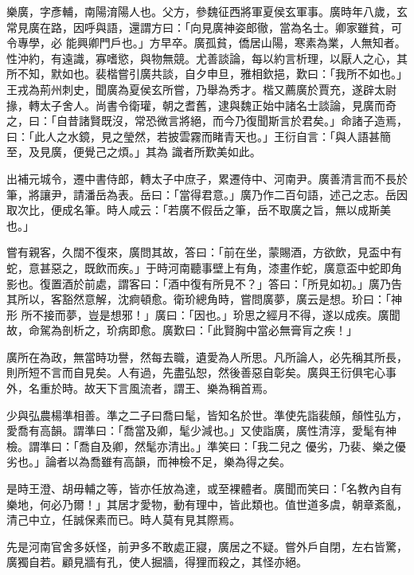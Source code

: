 \begin{pinyinscope}
 樂廣，字彥輔，南陽淯陽人也。父方，參魏征西將軍夏侯玄軍事。廣時年八歲，玄常見廣在路，因呼與語，還謂方曰：「向見廣神姿郎徹，當為名士。卿家雖貧，可令專學，必
 能興卿門戶也。」方早卒。廣孤貧，僑居山陽，寒素為業，人無知者。性沖約，有遠識，寡嗜慾，與物無競。尤善談論，每以約言析理，以厭人之心，其所不知，默如也。裴楷嘗引廣共談，自夕申旦，雅相欽挹，歎曰：「我所不如也。」王戎為荊州刺史，聞廣為夏侯玄所嘗，乃舉為秀才。楷又薦廣於賈充，遂辟太尉掾，轉太子舍人。尚書令衛瓘，朝之耆舊，逮與魏正始中諸名士談論，見廣而奇之，曰：「自昔諸賢既沒，常恐微言將絕，而今乃復聞斯言於君矣。」命諸子造焉，曰：「此人之水鏡，見之瑩然，若披雲霧而睹青天也。」王衍自言：「與人語甚簡至，及見廣，便覺己之煩。」其為
 識者所歎美如此。



 出補元城令，遷中書侍郎，轉太子中庶子，累遷侍中、河南尹。廣善清言而不長於筆，將讓尹，請潘岳為表。岳曰：「當得君意。」廣乃作二百句語，述己之志。岳因取次比，便成名筆。時人咸云：「若廣不假岳之筆，岳不取廣之旨，無以成斯美也。」



 嘗有親客，久闊不復來，廣問其故，答曰：「前在坐，蒙賜酒，方欲飲，見盃中有蛇，意甚惡之，既飲而疾。」于時河南聽事壁上有角，漆畫作蛇，廣意盃中蛇即角影也。復置酒於前處，謂客曰：「酒中復有所見不？」答曰：「所見如初。」廣乃告其所以，客豁然意解，沈痾頓愈。衛玠總角時，嘗問廣夢，廣云是想。玠曰：「神形
 所不接而夢，豈是想邪！」廣曰：「因也。」玠思之經月不得，遂以成疾。廣聞故，命駕為剖析之，玠病即愈。廣歎曰：「此賢胸中當必無膏肓之疾！」



 廣所在為政，無當時功譽，然每去職，遺愛為人所思。凡所論人，必先稱其所長，則所短不言而自見矣。人有過，先盡弘恕，然後善惡自彰矣。廣與王衍俱宅心事外，名重於時。故天下言風流者，謂王、樂為稱首焉。



 少與弘農楊準相善。準之二子曰喬曰髦，皆知名於世。準使先詣裴頠，頠性弘方，愛喬有高韻。謂準曰：「喬當及卿，髦少減也。」又使詣廣，廣性清淳，愛髦有神檢。謂準曰：「喬自及卿，然髦亦清出。」準笑曰：「我二兒之
 優劣，乃裴、樂之優劣也。」論者以為喬雖有高韻，而神檢不足，樂為得之矣。



 是時王澄、胡毋輔之等，皆亦任放為達，或至裸體者。廣聞而笑曰：「名教內自有樂地，何必乃爾！」其居才愛物，動有理中，皆此類也。值世道多虞，朝章紊亂，清己中立，任誠保素而已。時人莫有見其際焉。



 先是河南官舍多妖怪，前尹多不敢處正寢，廣居之不疑。嘗外戶自閉，左右皆驚，廣獨自若。顧見牆有孔，使人掘牆，得狸而殺之，其怪亦絕。




\end{pinyinscope}
